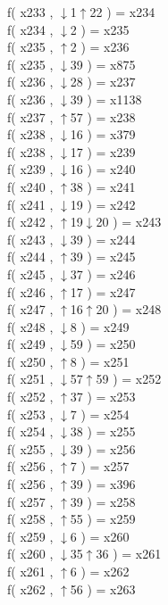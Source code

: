 f( x233 , $\downarrow$1$\uparrow$22 ) = x234 \\
f( x234 , $\downarrow$2 ) = x235 \\
f( x235 , $\uparrow$2 ) = x236 \\
f( x235 , $\downarrow$39 ) = x875 \\
f( x236 , $\downarrow$28 ) = x237 \\
f( x236 , $\downarrow$39 ) = x1138 \\
f( x237 , $\uparrow$57 ) = x238 \\
f( x238 , $\downarrow$16 ) = x379 \\
f( x238 , $\downarrow$17 ) = x239 \\
f( x239 , $\downarrow$16 ) = x240 \\
f( x240 , $\uparrow$38 ) = x241 \\
f( x241 , $\downarrow$19 ) = x242 \\
f( x242 , $\uparrow$19$\downarrow$20 ) = x243 \\
f( x243 , $\downarrow$39 ) = x244 \\
f( x244 , $\uparrow$39 ) = x245 \\
f( x245 , $\downarrow$37 ) = x246 \\
f( x246 , $\uparrow$17 ) = x247 \\
f( x247 , $\uparrow$16$\uparrow$20 ) = x248 \\
f( x248 , $\downarrow$8 ) = x249 \\
f( x249 , $\downarrow$59 ) = x250 \\
f( x250 , $\uparrow$8 ) = x251 \\
f( x251 , $\downarrow$57$\uparrow$59 ) = x252 \\
f( x252 , $\uparrow$37 ) = x253 \\
f( x253 , $\downarrow$7 ) = x254 \\
f( x254 , $\downarrow$38 ) = x255 \\
f( x255 , $\downarrow$39 ) = x256 \\
f( x256 , $\uparrow$7 ) = x257 \\
f( x256 , $\uparrow$39 ) = x396 \\
f( x257 , $\uparrow$39 ) = x258 \\
f( x258 , $\uparrow$55 ) = x259 \\
f( x259 , $\downarrow$6 ) = x260 \\
f( x260 , $\downarrow$35$\uparrow$36 ) = x261 \\
f( x261 , $\uparrow$6 ) = x262 \\
f( x262 , $\uparrow$56 ) = x263 \\
